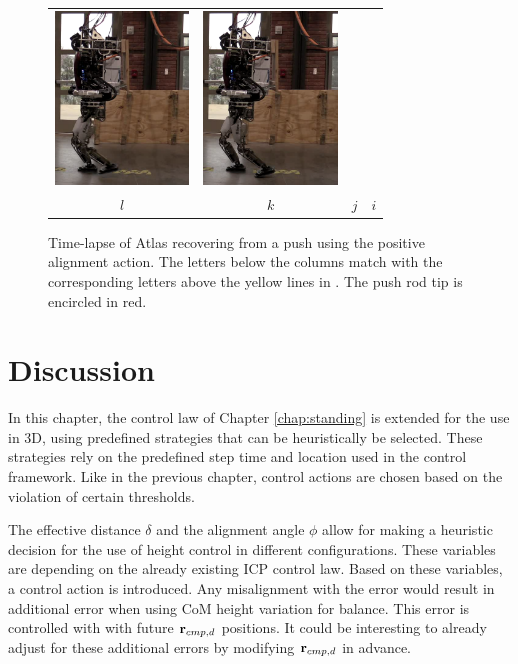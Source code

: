 \begin{figure}
\begin{tabular}{cccc}
    \includegraphics[width=1.4in]{STYLESTUFF/atw10} &
    \includegraphics[width=1.4in]{STYLESTUFF/atw9} \\
    $l$ & $k$ & $j$ & $i$ 
  \end{tabular}
  \caption{Time-lapse of Atlas recovering from a push using the positive alignment action. The letters below the columns match with the corresponding letters above the yellow lines in . The push rod tip is encircled in red.}
  \label{fig:atw}
\end{figure}
\section{Discussion}
In this chapter, the control law of Chapter \ref{chap:standing} is extended for the use in \ac{3D}, using predefined strategies that can be heuristically be selected. These strategies rely on the predefined step time and location used in the control framework. Like in the previous chapter, control actions are chosen based on the violation of certain thresholds. 

The effective distance $\delta$ and the alignment angle $\phi$ allow for making a heuristic decision for the use of height control in different configurations. These variables are depending on the already existing \ac{ICP} control law. Based on these variables, a control action is introduced. Any misalignment with the error would result in additional error when using \ac{CoM} height variation for balance. This error is controlled with with future $\mathbf{r}_{cmp,d}$ positions. It could be interesting to already adjust for these additional errors by modifying $\mathbf{r}_{cmp,d}$ in advance.

